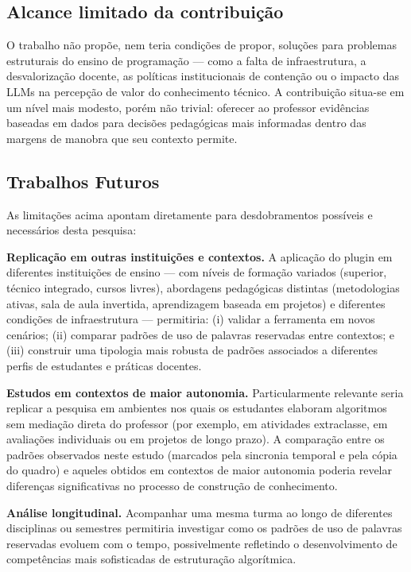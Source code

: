 \subsection{Alcance limitado da contribuição}
O trabalho não propõe, nem teria condições de propor, soluções para problemas estruturais do ensino de programação — como a falta de infraestrutura, a desvalorização docente, as políticas institucionais de contenção ou o impacto das LLMs na percepção de valor do conhecimento técnico. A contribuição situa-se em um nível mais modesto, porém não trivial: oferecer ao professor evidências baseadas em dados para decisões pedagógicas mais informadas dentro das margens de manobra que seu contexto permite.

\subsection{Trabalhos Futuros}

As limitações acima apontam diretamente para desdobramentos possíveis e necessários desta pesquisa:

\textbf{Replicação em outras instituições e contextos.} A aplicação do plugin em diferentes instituições de ensino — com níveis de formação variados (superior, técnico integrado, cursos livres), abordagens pedagógicas distintas (metodologias ativas, sala de aula invertida, aprendizagem baseada em projetos) e diferentes condições de infraestrutura — permitiria: (i) validar a ferramenta em novos cenários; (ii) comparar padrões de uso de palavras reservadas entre contextos; e (iii) construir uma tipologia mais robusta de padrões associados a diferentes perfis de estudantes e práticas docentes.

\textbf{Estudos em contextos de maior autonomia.} Particularmente relevante seria replicar a pesquisa em ambientes nos quais os estudantes elaboram algoritmos sem mediação direta do professor (por exemplo, em atividades extraclasse, em avaliações individuais ou em projetos de longo prazo). A comparação entre os padrões observados neste estudo (marcados pela sincronia temporal e pela cópia do quadro) e aqueles obtidos em contextos de maior autonomia poderia revelar diferenças significativas no processo de construção de conhecimento.

\textbf{Análise longitudinal.} Acompanhar uma mesma turma ao longo de diferentes disciplinas ou semestres permitiria investigar como os padrões de uso de palavras reservadas evoluem com o tempo, possivelmente refletindo o desenvolvimento de competências mais sofisticadas de estruturação algorítmica.

